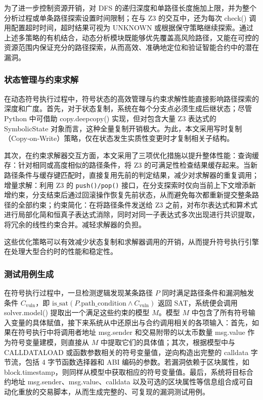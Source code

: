 \documentclass[print, master, vlined, timesmath]{DissertUESTC}
\begin{document}
为了进一步控制资源开销，对 DFS 的递归深度和单路径长度施加上限，并为整个分析过程或单条路径探索设置时间限制；在与 Z3 的交互中，还为每次 check() 调用配置超时时间，超时结果可视为 UNKNOWN 或根据保守策略继续探索。通过上述多策略的有机结合，动态分析模块既能够优先覆盖高风险路径，又能在可控的资源范围内保证充分的路径探索，从而高效、准确地定位和验证智能合约中的潜在漏洞。


\subsubsection{状态管理与约束求解}
在动态符号执行过程中，符号状态的高效管理与约束求解性能直接影响路径探索的深度和广度。首先，对于状态复制，系统在每个分支点必须生成后继状态；尽管 Python 中可借助 copy.deepcopy() 实现，但对包含大量 Z3 表达式的 SymbolicState 对象而言，这种全量复制开销极大。为此，本文采用写时复制（Copy‑on‑Write）策略，仅在状态发生实质性变更时才复制相关子结构。

其次，在约束求解器交互方面，本文采用了三项优化措施以提升整体性能：查询缓存：针对相同或高度相似的路径条件，将 Z3 的可满足性检查结果缓存起来。当新路径条件与缓存键匹配时，直接复用先前的判定结果，减少对求解器的重复调用；增量求解：利用 Z3 的 \texttt{push()/pop()} 接口，在分支探索时仅向当前上下文增添新增约束，分支结束后通过回滚操作恢复先前状态，从而避免每次都重新提交整条路径的全部约束；约束简化：在将路径条件发送给 Z3 之前，对布尔表达式和算术式进行局部化简和恒真子表达式消除，同时对同一子表达式多次出现进行共识提取，将冗余的线性约束合并。减轻求解器的负担。

这些优化策略可以有效减少状态复制和求解器调用的开销，从而提升符号执行引擎在处理大型合约时的性能和稳定性。

\subsubsection{测试用例生成}
在符号执行过程中，一旦检测逻辑发现某条路径 \(P\) 同时满足路径条件和漏洞触发条件 \(C_{\mathrm{vuln}}\)，即 \(\mathrm{is\_sat}(P.\mathrm{path\_condition}\land C_{\mathrm{vuln}})\) 返回 SAT，系统便会调用 solver.model() 提取出一个满足这些约束的模型 \(M\)。模型 \(M\) 中包含了所有符号输入变量的具体赋值，接下来系统从中还原出与合约调用相关的各项输入：首先，如果在符号执行中将调用者地址 msg.sender 和交易附带的以太币数量 msg.value 作为符号变量建模，则直接从 \(M\) 中提取它们的具体值；其次，根据模型中与 CALLDATALOAD 或函数参数相关的符号变量值，逆向构造出完整的 calldata 字节流，包括 4 字节函数选择器和 ABI 编码的参数。若漏洞依赖于区块属性，如 block.timestamp，则同样从模型中获取相应的符号变量值。最后，系统将目标合约地址 msg.sender、msg.value、calldata 以及可选的区块属性等信息组合成可自动化重放的交易脚本，从而生成完整的、可复现的漏洞测试用例。
\end{document}
